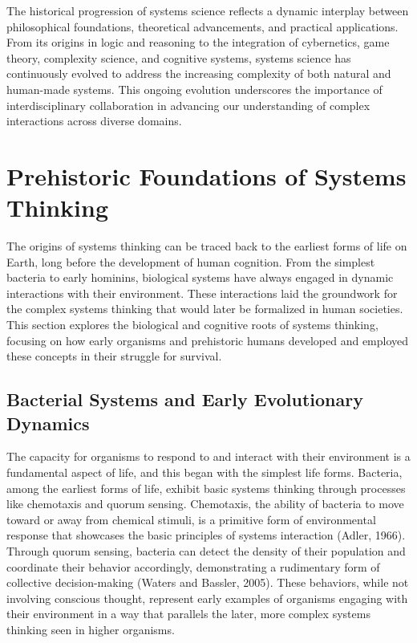 \documentclass[twocolumn]{article}
\begin{document}
\textcolor{primary}{The historical progression of systems science reflects a dynamic interplay between philosophical foundations, theoretical advancements, and practical applications. From its origins in logic and reasoning to the integration of cybernetics, game theory, complexity science, and cognitive systems, systems science has continuously evolved to address the increasing complexity of both natural and human-made systems. This ongoing evolution underscores the importance of interdisciplinary collaboration in advancing our understanding of complex interactions across diverse domains.}

\section{Prehistoric Foundations of Systems Thinking}

\textcolor{primary}{The origins of systems thinking can be traced back to the earliest forms of life on Earth, long before the development of human cognition. From the simplest bacteria to early hominins, biological systems have always engaged in dynamic interactions with their environment. These interactions laid the groundwork for the complex systems thinking that would later be formalized in human societies. This section explores the biological and cognitive roots of systems thinking, focusing on how early organisms and prehistoric humans developed and employed these concepts in their struggle for survival.}

\subsection{Bacterial Systems and Early Evolutionary Dynamics}

\textcolor{primary}{The capacity for organisms to respond to and interact with their environment is a fundamental aspect of life, and this began with the simplest life forms. Bacteria, among the earliest forms of life, exhibit basic systems thinking through processes like chemotaxis and quorum sensing. Chemotaxis, the ability of bacteria to move toward or away from chemical stimuli, is a primitive form of environmental response that showcases the basic principles of systems interaction (Adler, 1966). Through quorum sensing, bacteria can detect the density of their population and coordinate their behavior accordingly, demonstrating a rudimentary form of collective decision-making (Waters and Bassler, 2005). These behaviors, while not involving conscious thought, represent early examples of organisms engaging with their environment in a way that parallels the later, more complex systems thinking seen in higher organisms.}
\end{document}
